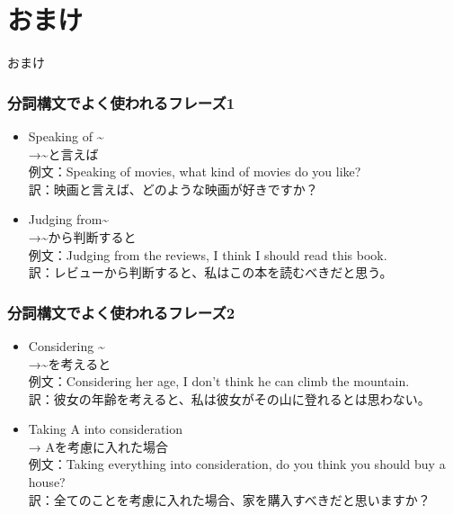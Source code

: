 \documentclass[xcolor=dvipsnames,unicode,14pt]{beamer}%
\begin{document}
\section{おまけ}
\begin{frame}
  \centering
  \LARGE おまけ

\end{frame}
\begin{frame}
  \frametitle{分詞構文でよく使われるフレーズ1}

  \begin{itemize}
    \item Speaking of \textasciitilde \\ 
          →\textasciitilde と言えば \\
          例文：\textcolor{NavyBlue}{Speaking of movies}, what kind of movies do you like? \\ 
          訳：\textcolor{NavyBlue}{映画と言えば}、どのような映画が好きですか？
    \item Judging from\textasciitilde \\ 
        →\textasciitilde から判断すると \\
        例文：\textcolor{NavyBlue}{Judging from the reviews}, I think I should read this book. \\ 
        訳：\textcolor{NavyBlue}{レビューから判断すると}、私はこの本を読むべきだと思う。
  \end{itemize}

\end{frame}
\begin{frame}
  \frametitle{分詞構文でよく使われるフレーズ2}

  \begin{itemize}
    \item Considering \textasciitilde \\ 
          →\textasciitilde を考えると \\
          例文：\textcolor{NavyBlue}{Considering her age}, I don't think he can climb the mountain. \\ 
          訳：\textcolor{NavyBlue}{彼女の年齢を考えると}、私は彼女がその山に登れるとは思わない。
    \item Taking A into consideration \\ 
        → Aを考慮に入れた場合 \\
        例文：\textcolor{NavyBlue}{Taking everything into consideration}, do you think you should buy a house? \\ 
        訳：\textcolor{NavyBlue}{全てのことを考慮に入れた場合}、家を購入すべきだと思いますか？
  \end{itemize}

\end{frame}
\end{document}
